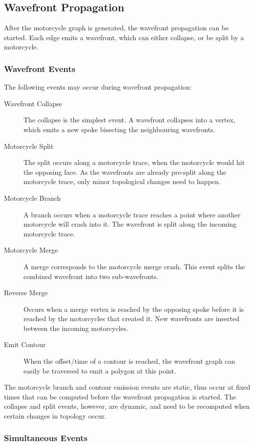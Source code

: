 \documentclass[12pt,a4paper,oneside,openany]{article}
\begin{document}
\subsection{Wavefront Propagation}

After the motorcycle graph is generated, the wavefront propagation can be started. Each edge emits a wavefront, which can either collapse, or be split by a motorcycle.

\subsubsection{Wavefront Events}

The following events may occur during wavefront propagation:
\begin{description}
\item[Wavefront Collapse] The collapse is the simplest event. A wavefront collapses into a vertex, which emits a new spoke bisecting the neighbouring wavefronts.
\item[Motorcycle Split] The split occurs along a motorcycle trace, when the motorcycle would hit the opposing face. As the wavefronts are already pre-split along the motorcycle trace, only minor topological changes need to happen.
\item[Motorcycle Branch] A branch occurs when a motorcycle trace reaches a point where another motorcycle will crash into it. The wavefront is split along the incoming motorcycle trace.
\item[Motorcycle Merge] A merge corresponds to the motorcycle merge crash. This event splits the combined wavefront into two sub-wavefronts.
\item[Reverse Merge] Occurs when a merge vertex is reached by the opposing spoke before it is reached by the motorcycles that created it. New wavefronts are inserted between the incoming motorcycles.
\item[Emit Contour] When the offset/time of a contour is reached, the wavefront graph can easily be traversed to emit a polygon at this point.
\end{description}

The motorcycle branch and contour emission events are static, thus occur at fixed times that can be computed before the wavefront propagation is started. The collapse and split events, however, are dynamic, and need to be recomputed when certain changes in topology occur.

\subsubsection{Simultaneous Events}
\end{document}
